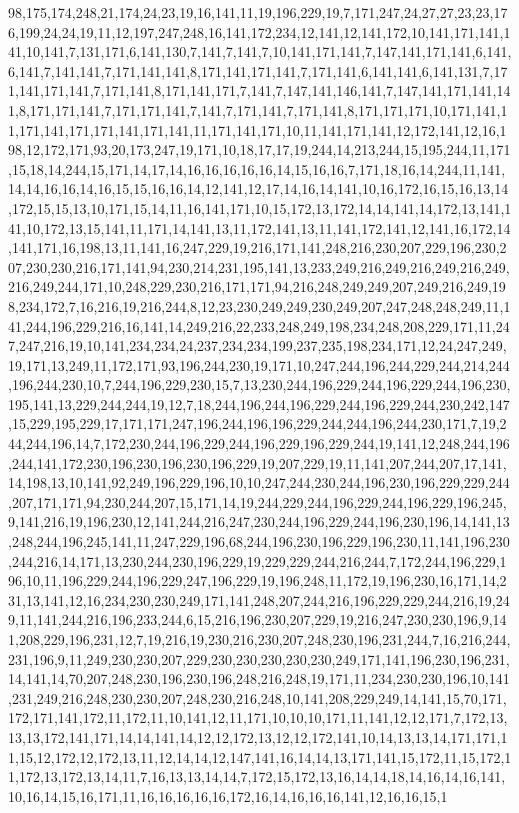 98,175,174,248,21,174,24,23,19,16,141,11,19,196,229,19,7,171,247,24,27,27,23,23,176,199,24,24,19,11,12,197,247,248,16,141,172,234,12,141,12,141,172,10,141,171,141,141,10,141,7,131,171,6,141,130,7,141,7,141,7,10,141,171,141,7,147,141,171,141,6,141,6,141,7,141,141,7,171,141,141,8,171,141,171,141,7,171,141,6,141,141,6,141,131,7,171,141,171,141,7,171,141,8,171,141,171,7,141,7,147,141,146,141,7,147,141,171,141,141,8,171,171,141,7,171,171,141,7,141,7,171,141,7,171,141,8,171,171,171,10,171,141,11,171,141,171,171,141,171,141,11,171,141,171,10,11,141,171,141,12,172,141,12,16,198,12,172,171,93,20,173,247,19,171,10,18,17,17,19,244,14,213,244,15,195,244,11,171,15,18,14,244,15,171,14,17,14,16,16,16,16,16,14,15,16,16,7,171,18,16,14,244,11,141,14,14,16,16,14,16,15,15,16,16,14,12,141,12,17,14,16,14,141,10,16,172,16,15,16,13,14,172,15,15,13,10,171,15,14,11,16,141,171,10,15,172,13,172,14,14,141,14,172,13,141,141,10,172,13,15,141,11,171,14,141,13,11,172,141,13,11,141,172,141,12,141,16,172,14,141,171,16,198,13,11,141,16,247,229,19,216,171,141,248,216,230,207,229,196,230,207,230,230,216,171,141,94,230,214,231,195,141,13,233,249,216,249,216,249,216,249,216,249,244,171,10,248,229,230,216,171,171,94,216,248,249,249,207,249,216,249,198,234,172,7,16,216,19,216,244,8,12,23,230,249,249,230,249,207,247,248,248,249,11,141,244,196,229,216,16,141,14,249,216,22,233,248,249,198,234,248,208,229,171,11,247,247,216,19,10,141,234,234,24,237,234,234,199,237,235,198,234,171,12,24,247,249,19,171,13,249,11,172,171,93,196,244,230,19,171,10,247,244,196,244,229,244,214,244,196,244,230,10,7,244,196,229,230,15,7,13,230,244,196,229,244,196,229,244,196,230,195,141,13,229,244,244,19,12,7,18,244,196,244,196,229,244,196,229,244,230,242,147,15,229,195,229,17,171,171,247,196,244,196,196,229,244,244,196,244,230,171,7,19,244,244,196,14,7,172,230,244,196,229,244,196,229,196,229,244,19,141,12,248,244,196,244,141,172,230,196,230,196,230,196,229,19,207,229,19,11,141,207,244,207,17,141,14,198,13,10,141,92,249,196,229,196,10,10,247,244,230,244,196,230,196,229,229,244,207,171,171,94,230,244,207,15,171,14,19,244,229,244,196,229,244,196,229,196,245,9,141,216,19,196,230,12,141,244,216,247,230,244,196,229,244,196,230,196,14,141,13,248,244,196,245,141,11,247,229,196,68,244,196,230,196,229,196,230,11,141,196,230,244,216,14,171,13,230,244,230,196,229,19,229,229,244,216,244,7,172,244,196,229,196,10,11,196,229,244,196,229,247,196,229,19,196,248,11,172,19,196,230,16,171,14,231,13,141,12,16,234,230,230,249,171,141,248,207,244,216,196,229,229,244,216,19,249,11,141,244,216,196,233,244,6,15,216,196,230,207,229,19,216,247,230,230,196,9,141,208,229,196,231,12,7,19,216,19,230,216,230,207,248,230,196,231,244,7,16,216,244,231,196,9,11,249,230,230,207,229,230,230,230,230,230,249,171,141,196,230,196,231,14,141,14,70,207,248,230,196,230,196,248,216,248,19,171,11,234,230,230,196,10,141,231,249,216,248,230,230,207,248,230,216,248,10,141,208,229,249,14,141,15,70,171,172,171,141,172,11,172,11,10,141,12,11,171,10,10,10,171,11,141,12,12,171,7,172,13,13,13,172,141,171,14,14,141,14,12,12,172,13,12,12,172,141,10,14,13,13,14,171,171,11,15,12,172,12,172,13,11,12,14,14,12,147,141,16,14,14,13,171,141,15,172,11,15,172,11,172,13,172,13,14,11,7,16,13,13,14,14,7,172,15,172,13,16,14,14,18,14,16,14,16,141,10,16,14,15,16,171,11,16,16,16,16,16,172,16,14,16,16,16,141,12,16,16,15,1